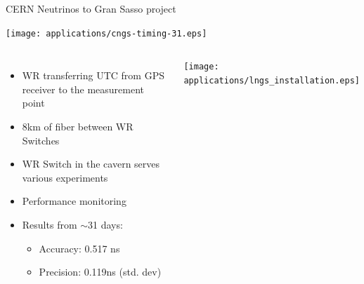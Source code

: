 \documentclass[compress,red]{beamer}
\begin{document}
\begin{frame}{CERN Neutrinos to Gran Sasso project}
   {
    \begin{center}
      \texttt{[image: applications/cngs-timing-31.eps]}
    \end{center}
  }
 
   {
  \begin{columns}[c]
    \begin{itemize}
      \item WR transferring UTC from GPS receiver to the measurement point
      \item 8km of fiber between WR Switches
      \item WR Switch in the cavern serves various experiments
      \item Performance monitoring
      \item Results from $\sim$31 days:
        \begin{itemize}
          \item Accuracy: 0.517 ns
          \item Precision: 0.119ns (std. dev)
        \end{itemize}
    \end{itemize}
    \begin{center}
      \texttt{[image: applications/lngs\_installation.eps]}
    \end{center}
  \end{columns}
  }

\end{frame}
\end{document}
